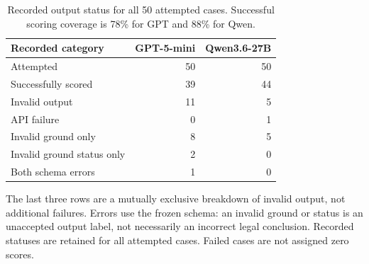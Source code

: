 \begin{table}[t]
\centering
\small
\setlength{\tabcolsep}{6pt}
\renewcommand{\arraystretch}{1.14}
\begin{tabular}{lrr}
\toprule
Recorded category & GPT-5-mini & Qwen3.6-27B \\
\midrule
Attempted & 50 & 50 \\
Successfully scored & 39 & 44 \\
Invalid output & 11 & 5 \\
API failure & 0 & 1 \\
\midrule
Invalid ground only & 8 & 5 \\
Invalid ground status only & 2 & 0 \\
Both schema errors & 1 & 0 \\
\bottomrule
\end{tabular}
\caption{Recorded output status for all 50 attempted cases. Successful scoring coverage is 78\% for GPT and 88\% for Qwen.}
\label{tab:cgen-t06}
\vspace{2pt}
\begin{minipage}{\textwidth}
\footnotesize The last three rows are a mutually exclusive breakdown of invalid output, not additional failures. Errors use the frozen schema: an invalid ground or status is an unaccepted output label, not necessarily an incorrect legal conclusion. Recorded statuses are retained for all attempted cases. Failed cases are not assigned zero scores.
\end{minipage}
\end{table}
